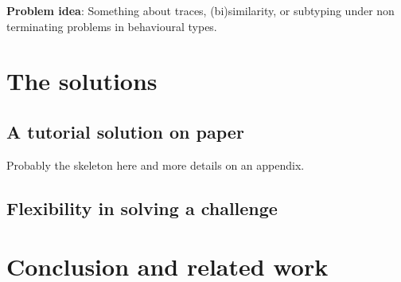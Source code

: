 \documentclass{jfp}
\begin{document}
\textbf{Problem idea}: Something about traces, (bi)similarity, or
subtyping under non terminating problems in behavioural types.

\section{The solutions}\label{sec:solutions}

\subsection{A tutorial solution on paper}\label{sec:tutorial}

Probably the skeleton here and more details on an appendix.

\subsection{Flexibility in solving a challenge}

\section{Conclusion and related work} \label{sec:conclusion}




\label{lastpage01}
\end{document}
